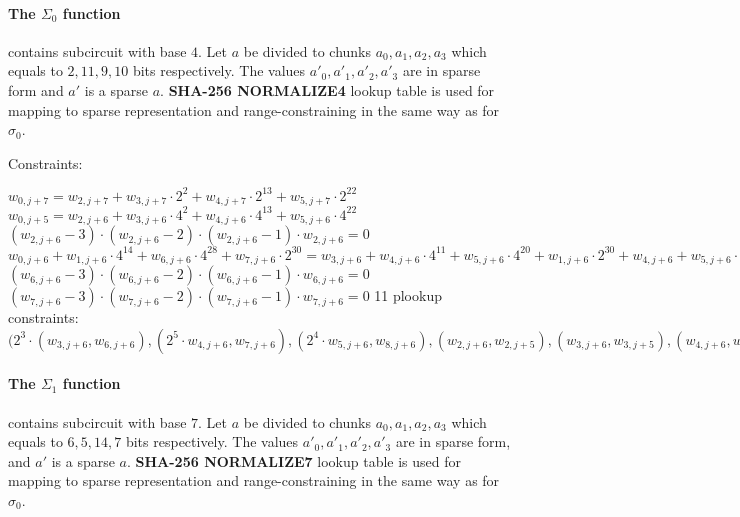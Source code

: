 \paragraph{The $\Sigma_0$ function}
contains subcircuit with base $4$.
Let $a$ be divided to chunks $a_0, a_1, a_2, a_3$ which equals to $2, 11, 9, 10$ bits respectively.
The values $a'_0, a'_1, a'_2, a'_3$ are in sparse form and $a'$ is a sparse $a$.
\textbf{SHA-256 NORMALIZE4} lookup table is used for mapping to sparse representation and range-constraining in the same way as for $\sigma_0$.

Constraints:
\begin{center}
    $w_{0, j + 7} = w_{2, j + 7} + w_{3, j + 7} \cdot 2^{2} + w_{4, j + 7} \cdot 2^{13} + w_{5, j + 7} \cdot 2^{22}$ \\
    $w_{0, j + 5} = w_{2, j + 6} + w_{3, j + 6} \cdot 4^{2} + w_{4, j + 6} \cdot 4^{13} + w_{5, j + 6} \cdot 4^{22}$ \\
    $(w_{2,j + 6} - 3) \cdot (w_{2,j + 6} - 2) \cdot (w_{2,j + 6} - 1) \cdot w_{2,j + 6} = 0$ \\
    $w_{0, j + 6} + w_{1, j + 6} \cdot 4^{14} + w_{6, j + 6} \cdot 4^{28} + w_{7, j + 6} \cdot 2^{30} = w_{3, j + 6} + w_{4, j + 6} \cdot 4^{11} + w_{5, j + 6} \cdot 4^{20} + w_{1, j + 6} \cdot 2^{30} + w_{4, j + 6} + w_{5, j + 6} \cdot 4^{9} + w_{2, j + 6} \cdot 4^{19} + w_{3, j + 6} \cdot 4^{21} + w_{5, j + 6} + w_{2, j + 6} \cdot 4^{10}+ w_{3, j + 6} \cdot 4^{12} + w_{4, j + 6} \cdot 4^{23}$ \\
    $(w_{6, j + 6} - 3) \cdot (w_{6, j + 6} - 2) \cdot (w_{6, j + 6} - 1) \cdot w_{6, j + 6} = 0$
    $(w_{7, j + 6} - 3) \cdot (w_{7, j + 6} - 2) \cdot (w_{7, j + 6} - 1) \cdot w_{7, j + 6} = 0$
    11 plookup constraints: $(2^3 \cdot (w_{3, j + 6}, w_{6, j + 6}), (2^5 \cdot w_{4, j + 6}, w_{7, j + 6}), (2^4 \cdot w_{5, j+6}, w_{8, j + 6}), (w_{2,j + 6}, w_{2,j+5}), (w_{3, j + 6}, w_{3, j + 5}), (w_{4, j + 6}, w_{4, j + 5}), (w_{5, j + 6}, w_{5, j + 5}), (w_{5, j + 5}, w_{0, j + 6}), (w_{6, j + 5}, w_{1, j + 6}), (w_{7, j + 5}, w_{6, j + 6}), (w_{8, j + 5}, w_{7, j + 6})$ \\
\end{center}

\paragraph{The $\Sigma_1$ function}
contains subcircuit with base $7$.
Let $a$ be divided to chunks $a_0, a_1, a_2, a_3$ which equals to $6, 5, 14, 7$ bits respectively.
The values $a'_0, a'_1, a'_2, a'_3$ are in sparse form, and $a'$ is a sparse $a$.
\textbf{SHA-256 NORMALIZE7} lookup table is used for mapping to sparse representation and range-constraining in the same way as for $\sigma_0$.

